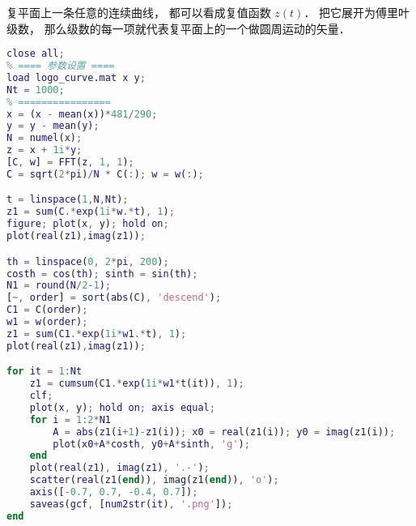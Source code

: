 
\begin{issues}
\issueDraft
\end{issues}


复平面上一条任意的连续曲线， 都可以看成复值函数 $z(t)$． 把它展开为傅里叶级数， 那么级数的每一项就代表复平面上的一个做圆周运动的矢量．

\begin{lstlisting}[language=matlab, caption=FFTplt]
close all;
% ==== 参数设置 ====
load logo_curve.mat x y;
Nt = 1000;
% ================
x = (x - mean(x))*481/290;
y = y - mean(y);
N = numel(x);
z = x + 1i*y;
[C, w] = FFT(z, 1, 1);
C = sqrt(2*pi)/N * C(:); w = w(:);

t = linspace(1,N,Nt);
z1 = sum(C.*exp(1i*w.*t), 1);
figure; plot(x, y); hold on;
plot(real(z1),imag(z1));

th = linspace(0, 2*pi, 200);
costh = cos(th); sinth = sin(th);
N1 = round(N/2-1);
[~, order] = sort(abs(C), 'descend');
C1 = C(order);
w1 = w(order);
z1 = sum(C1.*exp(1i*w1.*t), 1);
plot(real(z1),imag(z1));

for it = 1:Nt
    z1 = cumsum(C1.*exp(1i*w1*t(it)), 1);
    clf;
    plot(x, y); hold on; axis equal;
    for i = 1:2*N1
        A = abs(z1(i+1)-z1(i)); x0 = real(z1(i)); y0 = imag(z1(i));
        plot(x0+A*costh, y0+A*sinth, 'g');
    end
    plot(real(z1), imag(z1), '.-');
    scatter(real(z1(end)), imag(z1(end)), 'o');
    axis([-0.7, 0.7, -0.4, 0.7]);
    saveas(gcf, [num2str(it), '.png']);
end
\end{lstlisting}
